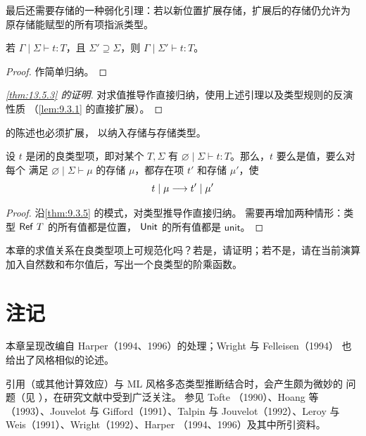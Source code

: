 最后还需要存储的一种弱化引理：若以新位置扩展存储，扩展后的存储仍允许为
原存储能赋型的所有项指派类型。

\begin{lemma}
\label{lem:13.5.6}
若 \(\Gamma\mid\Sigma\vdash t:T\)，且
\(\Sigma'\supseteq\Sigma\)，则
\(\Gamma\mid\Sigma'\vdash t:T\)。
\end{lemma}

\begin{proof}
作简单归纳。
\end{proof}

\begin{proof}[\cref{thm:13.5.3} 的证明]
对求值推导作直接归纳，使用上述引理以及类型规则的反演性质
（\cref{lem:9.3.1} 的直接扩展）。
\end{proof}

的陈述也必须扩展，
以纳入存储与存储类型。

\begin{theorem}[进展性]
\label{thm:13.5.7}
设 \(t\) 是闭的良类型项，即对某个 \(T,\Sigma\) 有
\(\varnothing\mid\Sigma\vdash t:T\)。那么，\(t\) 要么是值，要么对每个
满足 \(\varnothing\mid\Sigma\vdash\mu\) 的存储 \(\mu\)，都存在项 \(t'\)
和存储 \(\mu'\)，使
\[
t\mid\mu\mathrel{\longrightarrow} t'\mid\mu'
\]
\end{theorem}

\begin{proof}
沿\cref{thm:9.3.5} 的模式，对类型推导作直接归纳。
需要再增加两种情形：类型
\(\mathsf{Ref}\ T\) 的所有值都是位置，
\(\mathsf{Unit}\) 的所有值都是 \(\mathsf{unit}\)。
\end{proof}

\begin{exercise}
\label{ex:13.5.8}
本章的求值关系在良类型项上可规范化吗？若是，请证明；若不是，请在当前演算
加入自然数和布尔值后，写出一个良类型的阶乘函数。
\end{exercise}

\section{注记}
\label{sec:13.6}

本章呈现改编自 Harper（1994、1996）的处理；Wright 与 Felleisen（1994）
也给出了风格相似的论述。

引用（或其他计算效应）与 ML 风格多态类型推断结合时，会产生颇为微妙的
问题（见 ），在研究文献中受到广泛关注。
参见 Tofte
（1990）、Hoang 等（1993）、Jouvelot 与 Gifford（1991）、Talpin 与
Jouvelot（1992）、Leroy 与 Weis（1991）、Wright（1992）、Harper
（1994、1996）及其中所引资料。

